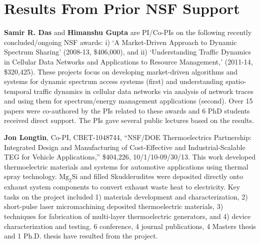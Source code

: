 \section{Results From Prior NSF Support}

\textbf{Samir R. Das} and \textbf{Himanshu Gupta} are PI/Co-PIs on the following 
recently concluded/ongoing NSF awards:
i) `A Market-Driven Approach to Dynamic Spectrum Sharing' (2008-13, \$406,000), and  ii) 
`Understanding Traffic Dynamics in Cellular Data Networks and Applications to Resource Management,' (2011-14, \$320,425).  
%
These projects
focus on developing market-driven algorithms and systems for dynamic spectrum access systems (first)
and understanding spatio-temporal traffic dynamics in cellular data networks via analysis of network traces and using them
for spectrum/energy management applications (second). Over 15 papers were co-authored by the PIs 
related to these awards and 6 PhD students received
direct support. The PIs gave several public lectures based on the results.

\textbf{Jon Longtin}, Co-PI, CBET-1048744, ``NSF/DOE Thermoelectrics Partnership:
Integrated Design and Manufacturing of Cost-Effective and
Industrial-Scalable TEG for Vehicle Applications,'' \$404,226,
10/1/10-09/30/13. This work developed thermoelectric materials and systems
for automotive applications using thermal spray technology. $\mathrm{Mg_{2}Si}$ and
filled Skudderudites were deposited directly onto exhaust system
components to convert exhaust waste heat to electricity. Key tasks on the
project included 1) materials development and characterization, 2)
short-pulse laser micromachining deposited thermoelectric materials, 3)
techniques for fabrication of multi-layer thermoelectric generators, and
4) device characterization and testing.  6 conference, 4 journal
publications, 4 Masters thesis and 1 Ph.D. thesis have resulted from the
project.


